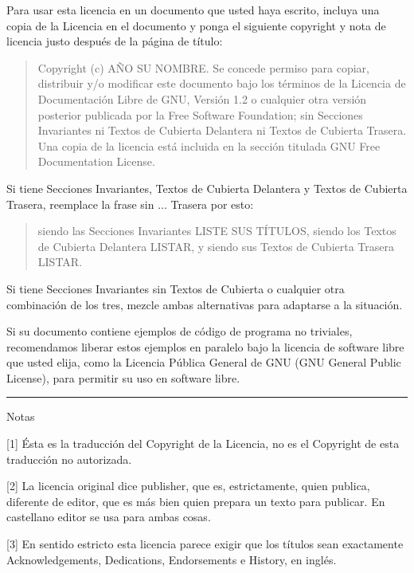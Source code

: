 Para usar esta licencia en un documento que usted haya escrito, incluya
una copia de la Licencia en el documento y ponga el siguiente copyright
y nota de licencia justo después de la página de título:
\begin{quote}
Copyright (c) AÑO SU NOMBRE. Se concede permiso para copiar, distribuir
y/o modificar este documento bajo los términos de la Licencia de Documentación
Libre de GNU, Versión 1.2 o cualquier otra versión posterior publicada
por la Free Software Foundation; sin Secciones Invariantes ni Textos
de Cubierta Delantera ni Textos de Cubierta Trasera. Una copia de
la licencia está incluida en la sección titulada GNU Free Documentation
License. 
\end{quote}
Si tiene Secciones Invariantes, Textos de Cubierta Delantera y Textos
de Cubierta Trasera, reemplace la frase sin ... Trasera por esto:
\begin{quote}
siendo las Secciones Invariantes LISTE SUS TÍTULOS, siendo los Textos
de Cubierta Delantera LISTAR, y siendo sus Textos de Cubierta Trasera
LISTAR. 
\end{quote}
Si tiene Secciones Invariantes sin Textos de Cubierta o cualquier
otra combinación de los tres, mezcle ambas alternativas para adaptarse
a la situación.

Si su documento contiene ejemplos de código de programa no triviales,
recomendamos liberar estos ejemplos en paralelo bajo la licencia de
software libre que usted elija, como la Licencia Pública General de
GNU (GNU General Public License), para permitir su uso en software
libre.

\rule{1\linewidth}{1pt}

Notas

{[}1{]} Ésta es la traducción del Copyright de la Licencia, no es
el Copyright de esta traducción no autorizada.

{[}2{]} La licencia original dice publisher, que es, estrictamente,
quien publica, diferente de editor, que es más bien quien prepara
un texto para publicar. En castellano editor se usa para ambas cosas.

{[}3{]} En sentido estricto esta licencia parece exigir que los títulos
sean exactamente Acknowledgements, Dedications, Endorsements e History,
en inglés.
